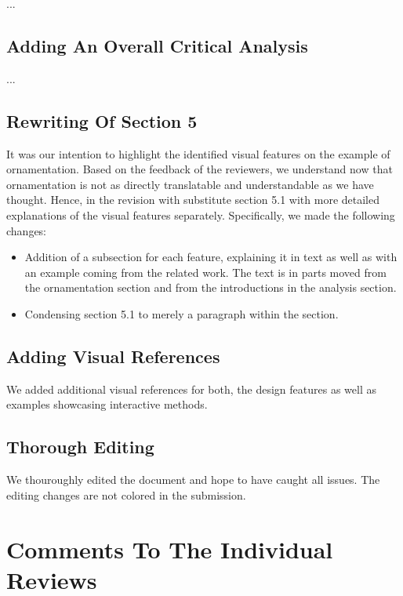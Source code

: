\documentclass{egpubl}
\newcommand{\rev}[2]{{\color{greenrev}\textsuperscript{#1}#2}}
\renewcommand{\rev}[2]{{#2}}
\begin{document}
...

\subsection*{Adding An Overall Critical Analysis}

...

\subsection*{Rewriting Of Section 5}

\rev{}{It was our intention to highlight the identified visual features on the example of ornamentation. Based on the feedback of the reviewers, we understand now that ornamentation is not as directly translatable and understandable as we have thought. Hence, in the revision with substitute section 5.1 with more detailed explanations of the visual features separately. Specifically, we made the following changes:
\begin{itemize}
    \item Addition of a subsection for each feature, explaining it in text as well as with an example coming from the related work. The text is in parts moved from the ornamentation section and from the introductions in the analysis section.
    \item Condensing section 5.1 to merely a paragraph within the section.
\end{itemize}
}

\subsection*{Adding Visual References}

\rev{}{We added additional visual references for both, the design features as well as examples showcasing interactive methods.}

\subsection*{Thorough Editing}

\rev{}{We thouroughly edited the document and hope to have caught all issues. The editing changes are not colored in the submission.}


\section*{Comments To The Individual Reviews}
\end{document}
